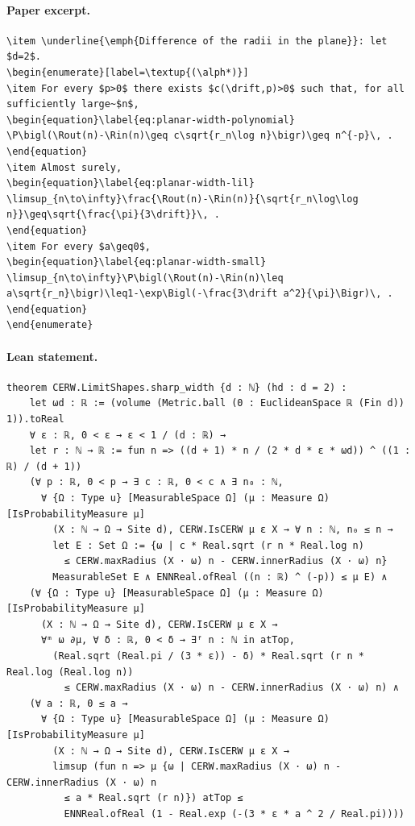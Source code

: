 \paragraph{Paper excerpt.}
\begin{verbatim}
\item \underline{\emph{Difference of the radii in the plane}}: let $d=2$.
\begin{enumerate}[label=\textup{(\alph*)}]
\item For every $p>0$ there exists $c(\drift,p)>0$ such that, for all sufficiently large~$n$,
\begin{equation}\label{eq:planar-width-polynomial}
\P\bigl(\Rout(n)-\Rin(n)\geq c\sqrt{r_n\log n}\bigr)\geq n^{-p}\, .
\end{equation}
\item Almost surely,
\begin{equation}\label{eq:planar-width-lil}
\limsup_{n\to\infty}\frac{\Rout(n)-\Rin(n)}{\sqrt{r_n\log\log n}}\geq\sqrt{\frac{\pi}{3\drift}}\, .
\end{equation}
\item For every $a\geq0$,
\begin{equation}\label{eq:planar-width-small}
\limsup_{n\to\infty}\P\bigl(\Rout(n)-\Rin(n)\leq a\sqrt{r_n}\bigr)\leq1-\exp\Bigl(-\frac{3\drift a^2}{\pi}\Bigr)\, .
\end{equation}
\end{enumerate}
\end{verbatim}
\paragraph{Lean statement.}
\begin{verbatim}
theorem CERW.LimitShapes.sharp_width {d : ℕ} (hd : d = 2) :
    let ωd : ℝ := (volume (Metric.ball (0 : EuclideanSpace ℝ (Fin d)) 1)).toReal
    ∀ ε : ℝ, 0 < ε → ε < 1 / (d : ℝ) →
    let r : ℕ → ℝ := fun n => ((d + 1) * n / (2 * d * ε * ωd)) ^ ((1 : ℝ) / (d + 1))
    (∀ p : ℝ, 0 < p → ∃ c : ℝ, 0 < c ∧ ∃ n₀ : ℕ,
      ∀ {Ω : Type u} [MeasurableSpace Ω] (μ : Measure Ω) [IsProbabilityMeasure μ]
        (X : ℕ → Ω → Site d), CERW.IsCERW μ ε X → ∀ n : ℕ, n₀ ≤ n →
        let E : Set Ω := {ω | c * Real.sqrt (r n * Real.log n)
          ≤ CERW.maxRadius (X · ω) n - CERW.innerRadius (X · ω) n}
        MeasurableSet E ∧ ENNReal.ofReal ((n : ℝ) ^ (-p)) ≤ μ E) ∧
    (∀ {Ω : Type u} [MeasurableSpace Ω] (μ : Measure Ω) [IsProbabilityMeasure μ]
      (X : ℕ → Ω → Site d), CERW.IsCERW μ ε X →
      ∀ᵐ ω ∂μ, ∀ δ : ℝ, 0 < δ → ∃ᶠ n : ℕ in atTop,
        (Real.sqrt (Real.pi / (3 * ε)) - δ) * Real.sqrt (r n * Real.log (Real.log n))
          ≤ CERW.maxRadius (X · ω) n - CERW.innerRadius (X · ω) n) ∧
    (∀ a : ℝ, 0 ≤ a →
      ∀ {Ω : Type u} [MeasurableSpace Ω] (μ : Measure Ω) [IsProbabilityMeasure μ]
        (X : ℕ → Ω → Site d), CERW.IsCERW μ ε X →
        limsup (fun n => μ {ω | CERW.maxRadius (X · ω) n - CERW.innerRadius (X · ω) n
          ≤ a * Real.sqrt (r n)}) atTop ≤
          ENNReal.ofReal (1 - Real.exp (-(3 * ε * a ^ 2 / Real.pi))))
\end{verbatim}
